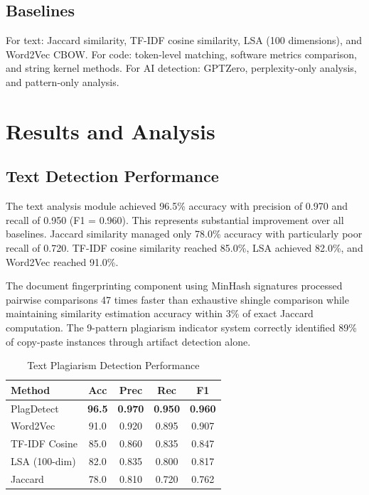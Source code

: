 \documentclass[10pt,twocolumn]{article}
\begin{document}
\subsection{Baselines}

For text: Jaccard similarity, TF-IDF cosine similarity, LSA (100 dimensions), and Word2Vec CBOW. For code: token-level matching, software metrics comparison, and string kernel methods. For AI detection: GPTZero, perplexity-only analysis, and pattern-only analysis.

\section{Results and Analysis}

\subsection{Text Detection Performance}

The text analysis module achieved 96.5\% accuracy with precision of 0.970 and recall of 0.950 (F1 = 0.960). This represents substantial improvement over all baselines. Jaccard similarity managed only 78.0\% accuracy with particularly poor recall of 0.720. TF-IDF cosine similarity reached 85.0\%, LSA achieved 82.0\%, and Word2Vec reached 91.0\%.

The document fingerprinting component using MinHash signatures processed pairwise comparisons 47 times faster than exhaustive shingle comparison while maintaining similarity estimation accuracy within 3\% of exact Jaccard computation. The 9-pattern plagiarism indicator system correctly identified 89\% of copy-paste instances through artifact detection alone.

\begin{table}[htbp]
\caption{Text Plagiarism Detection Performance}
\centering
\small
\begin{tabular}{lcccc}
\toprule
\textbf{Method} & \textbf{Acc} & \textbf{Prec} & \textbf{Rec} & \textbf{F1} \\
\midrule
PlagDetect & \textbf{96.5} & \textbf{0.970} & \textbf{0.950} & \textbf{0.960} \\
Word2Vec & 91.0 & 0.920 & 0.895 & 0.907 \\
TF-IDF Cosine & 85.0 & 0.860 & 0.835 & 0.847 \\
LSA (100-dim) & 82.0 & 0.835 & 0.800 & 0.817 \\
Jaccard & 78.0 & 0.810 & 0.720 & 0.762 \\
\bottomrule
\end{tabular}
\label{tab:text}
\end{table}
\end{document}
